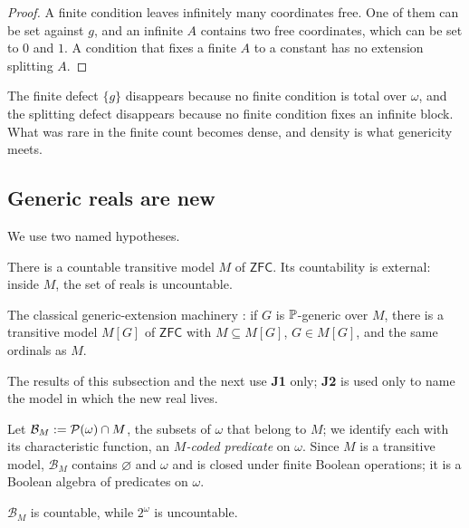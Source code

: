 \begin{proof}
A finite condition leaves infinitely many coordinates free. One of them can be set against $g$,
and an infinite $A$ contains two free coordinates, which can be set to $0$ and $1$. A condition
that fixes a finite $A$ to a constant has no extension splitting $A$.
\end{proof}

The finite defect $\{g\}$ disappears because no finite condition is total over $\omega$, and the
splitting defect disappears because no finite condition fixes an infinite block. What was rare in
the finite count becomes dense, and density is what genericity meets.

\subsection{Generic reals are new}\label{ssec:genericity}

We use two named hypotheses.
\begin{description}[leftmargin=1.2em]
\item[\textbf{J1}.] There is a countable transitive model $M$ of $\mathsf{ZFC}$. Its countability
is external: inside $M$, the set of reals is uncountable.
\item[\textbf{J2}.] The classical generic-extension machinery \citep{Cohen1966,Kunen2011}: if $G$
is $\mathbb{P}$-generic over $M$, there is a transitive model $M[G]$ of $\mathsf{ZFC}$ with
$M\subseteq M[G]$, $G\in M[G]$, and the same ordinals as $M$.
\end{description}
The results of this subsection and the next use \textbf{J1} only; \textbf{J2} is used only to name
the model in which the new real lives.

\begin{definition}\label{def:groundlens}
Let $\mathcal B_M:=\mathcal{P}(\omega)\cap M$, the subsets of $\omega$ that belong to $M$; we identify
each with its characteristic function, an \emph{$M$-coded predicate} on $\omega$. Since $M$ is a
transitive model, $\mathcal B_M$ contains $\varnothing$ and $\omega$ and is closed under finite
Boolean operations; it is a Boolean algebra of predicates on $\omega$.
\end{definition}

\begin{lemma}\label{lem:countable}
$\mathcal B_M$ is countable, while $2^\omega$ is uncountable.
\end{lemma}

